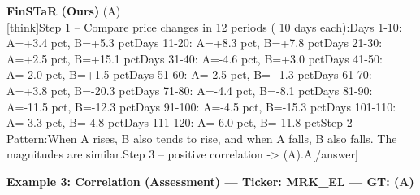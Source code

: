 \begin{minipage}[t]{0.41\textwidth}
\colorbox{green!10}{\parbox{\dimexpr\textwidth-2\fboxsep}{
\textbf{FinSTaR (Ours)} \textcolor{green!50!black}{(A)} \\[2pt]
\tiny
[think]\newline Step 1 -- Compare price changes in 12 periods ( 10 days each):\newline   Days 1-10: A=+3.4 pct, B=+5.3 pct\newline   Days 11-20: A=+8.3 pct, B=+7.8 pct\newline   Days 21-30: A=+2.5 pct, B=+15.1 pct\newline   Days 31-40: A=-4.6 pct, B=+3.0 pct\newline   Days 41-50: A=-2.0 pct, B=+1.5 pct\newline   Days 51-60: A=-2.5 pct, B=+1.3 pct\newline   Days 61-70: A=+3.8 pct, B=-20.3 pct\newline   Days 71-80: A=-4.4 pct, B=-8.1 pct\newline   Days 81-90: A=-11.5 pct, B=-12.3 pct\newline   Days 91-100: A=-4.5 pct, B=-15.3 pct\newline   Days 101-110: A=-3.3 pct, B=-4.8 pct\newline   Days 111-120: A=-6.0 pct, B=-11.8 pct\newline Step 2 -- Pattern:\newline When A rises, B also tends to rise, and when A falls, B also falls. The magnitudes are similar.\newline Step 3 -- positive correlation -> (A).\newline [/think]\newline [answer]A[/answer]
}}
\end{minipage}
\vspace{8pt}


\noindent
\textbf{Example 3: Correlation (Assessment) --- Ticker: MRK\_EL --- GT: (A)}
\vspace{2pt}

